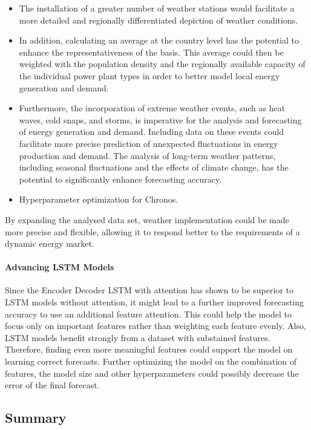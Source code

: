 \documentclass[a4paper]{article}
\begin{document}
\begin{itemize}
\item
  The installation of a greater number of weather stations would
  facilitate a more detailed and regionally differentiated depiction of
  weather conditions.
\item
  In addition, calculating an average at the country level has the
  potential to enhance the representativeness of the basis. This average
  could then be weighted with the population density and the regionally
  available capacity of the individual power plant types in order to
  better model local energy generation and demand.
\item
  Furthermore, the incorporation of extreme weather events, such as heat
  waves, cold snaps, and storms, is imperative for the analysis and
  forecasting of energy generation and demand. Including data on these
  events could facilitate more precise prediction of unexpected
  fluctuations in energy production and demand. The analysis of
  long-term weather patterns, including seasonal fluctuations and the
  effects of climate change, has the potential to significantly enhance
  forecasting accuracy.
\item
  Hyperparameter optimization for Chronos.
\end{itemize}

By expanding the analysed data set, weather implementation could be made
more precise and flexible, allowing it to respond better to the
requirements of a dynamic energy market.

    \paragraph{Advancing LSTM Models}\label{advancing-lstm-models}

Since the Encoder Decoder LSTM with attention has shown to be superior
to LSTM models without attention, it might lead to a further improved
forecasting accuracy to use an additional feature attention. This could
help the model to focus only on important features rather than weighting
each feature evenly. Also, LSTM models benefit strongly from a dataset
with substained features. Therefore, finding even more meaningful
features could support the model on learning correct forecasts. Further
optimizing the model on the combination of features, the model size and
other hyperparameters could possibly decrease the error of the final
forecast.

    \subsection{Summary}\label{summary}
\end{document}
